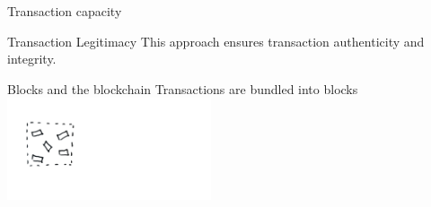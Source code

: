 \documentclass[]{beamer}
\begin{document}
\begin{frame}{Transaction capacity}  %
	
	\begin{figure}[h!]
		\center
		
	\end{figure}\vspace{1em}

\end{frame}


\begin{frame}{Transaction Legitimacy}
	\vspace{1em}
This approach ensures transaction \color{focus}authenticity \color{black}and \color{focus}integrity\color{black}.
	\vspace{1em}
\uncover<1->{
	\begin{figure}[h!]
		\center
		
	\end{figure}
	}
\end{frame}


\begin{frame}{Blocks and the blockchain}
Transactions are bundled into blocks \\
\includegraphics[width=6cm]{../assets/images/block_1.png} \\
\end{frame}
\end{document}
